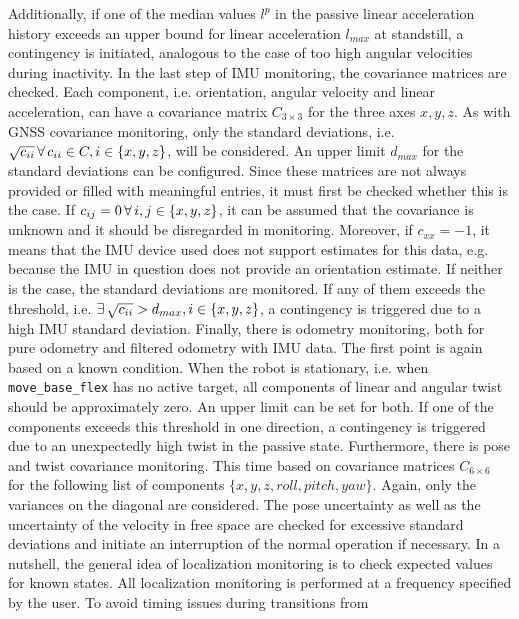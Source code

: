 \documentclass[english, master, utf8]{base/thesis_KBS}
\newcommand{\code}[1]{\colorbox{light-gray}{\texttt{#1}}}
\begin{document}
Additionally, if one of the median values $l^p$ in the passive linear acceleration history exceeds an upper bound for linear acceleration $l_{max}$ at standstill, a contingency is initiated,
analogous to the case of too high angular velocities during inactivity. In the last step of IMU monitoring, the covariance matrices are checked. Each component, i.e. orientation, angular
velocity and linear acceleration, can have a covariance matrix $C_{3 \times 3}$ for the three axes $x, y, z$. As with GNSS covariance monitoring, only the standard deviations, i.e.
$\sqrt{c_{ii}} \thinspace \forall \thinspace c_{ii} \in C, i \in \{x, y, z\}$, will be considered. An upper limit $d_{max}$ for the standard deviations can be configured. Since these matrices are
not always provided or filled with meaningful entries, it must first be checked whether this is the case. If $c_{ij} = 0 \thinspace \forall \thinspace i, j \in \{x, y, z\}$,
it can be assumed that the covariance is unknown and it should be disregarded in monitoring. Moreover, if $c_{xx} = -1$, it means that the IMU device used does not support estimates
for this data, e.g. because the IMU in question does not provide an orientation estimate. If neither is the case, the standard deviations are monitored.  If any
of them exceeds the threshold, i.e. $\exists \thinspace \sqrt{c_{ii}} > d_{max}, i \in \{x, y, z\}$, a contingency is triggered due to a high IMU standard deviation. Finally, there is odometry monitoring, both for pure
odometry and filtered odometry with IMU data. The first point is again based on a known condition. When the robot is stationary, i.e. when \code{move\_base\_flex} has no active target,
all components of linear and angular twist should be approximately zero. An upper limit can be set for both. If one of the components exceeds this threshold in one direction, a
contingency is triggered due to an unexpectedly high twist in the passive state. Furthermore, there is pose and twist covariance monitoring. This time based on
covariance matrices $C_{6 \times 6}$ for the following list of components $\{x, y, z, roll, pitch, yaw\}$. Again, only the variances on the diagonal are considered. The pose uncertainty as well as the uncertainty of the velocity
in free space are checked for excessive standard deviations and initiate an interruption of the normal operation if necessary. In a nutshell, the general idea of localization
monitoring is to check expected values for known states. All localization monitoring is performed at a frequency specified by the user. To avoid timing issues during transitions from
\end{document}
